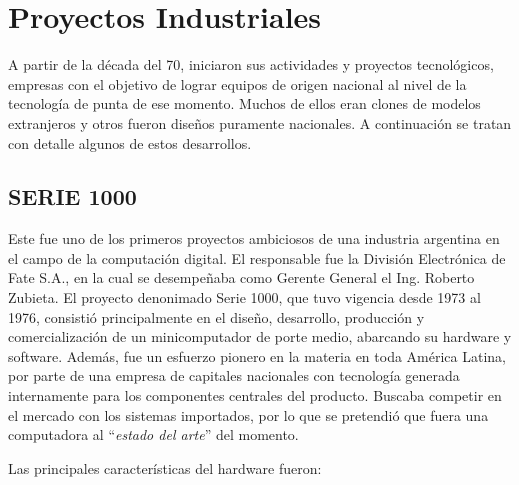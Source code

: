 \documentclass[%
 	final,
%
	notitlepage,
	narroweqnarray,
	inline,
 	twoside,
	]{ieee}
\begin{document}
\section{Proyectos Industriales}

A partir de la d\'ecada del 70, iniciaron sus actividades y proyectos tecnol\'ogicos, empresas con el objetivo de lograr equipos de origen nacional al nivel de la tecnolog\'ia de punta de ese momento. Muchos de ellos eran clones de modelos extranjeros y otros fueron dise\~nos puramente nacionales.
A continuaci\'on se tratan con detalle algunos de estos desarrollos.

\subsection*{SERIE 1000}

Este fue uno de los primeros proyectos ambiciosos de una industria argentina en el campo de la computaci\'on digital. El responsable fue la Divisi\'on Electr\'onica de Fate S.A., en la cual se desempe\~naba como Gerente General el Ing. Roberto Zubieta.
El proyecto denonimado Serie 1000, que tuvo vigencia desde 1973 al 1976, consisti\'o principalmente en el dise\~no, desarrollo, producci\'on y comercializaci\'on de un minicomputador de porte medio, abarcando su hardware y software. Adem\'as, fue un esfuerzo pionero en la materia en toda Am\'erica Latina, por parte de una empresa de capitales nacionales con tecnolog\'ia generada internamente para los componentes centrales del producto. Buscaba competir en el mercado con los sistemas importados, por lo que se pretendi\'o que fuera una computadora al ``\textit{estado del arte}'' del momento.

Las principales caracter\'isticas del hardware fueron:\\
\end{document}
